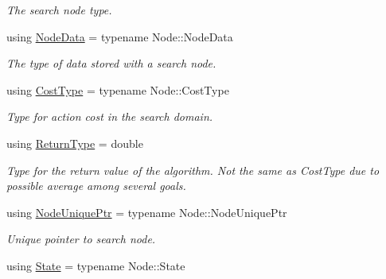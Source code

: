 \begin{DoxyCompactItemize}
\begin{DoxyCompactList}\small\item\em The search node type. \end{DoxyCompactList}\item 
using \hyperlink{structalgorithm_1_1BaseTraits_a05b654af4d6bd35af9e72d36a12d904f}{Node\+Data} = typename Node\+::\+Node\+Data\hypertarget{structalgorithm_1_1BaseTraits_a05b654af4d6bd35af9e72d36a12d904f}{}\label{structalgorithm_1_1BaseTraits_a05b654af4d6bd35af9e72d36a12d904f}

\begin{DoxyCompactList}\small\item\em The type of data stored with a search node. \end{DoxyCompactList}\item 
using \hyperlink{structalgorithm_1_1BaseTraits_ac8df9cb2ac3a5f35e201bf1a26dceed9}{Cost\+Type} = typename Node\+::\+Cost\+Type\hypertarget{structalgorithm_1_1BaseTraits_ac8df9cb2ac3a5f35e201bf1a26dceed9}{}\label{structalgorithm_1_1BaseTraits_ac8df9cb2ac3a5f35e201bf1a26dceed9}

\begin{DoxyCompactList}\small\item\em Type for action cost in the search domain. \end{DoxyCompactList}\item 
using \hyperlink{structalgorithm_1_1BaseTraits_a4bfbea73f1059634690455ff7128843d}{Return\+Type} = double\hypertarget{structalgorithm_1_1BaseTraits_a4bfbea73f1059634690455ff7128843d}{}\label{structalgorithm_1_1BaseTraits_a4bfbea73f1059634690455ff7128843d}

\begin{DoxyCompactList}\small\item\em Type for the return value of the algorithm. Not the same as Cost\+Type due to possible average among several goals. \end{DoxyCompactList}\item 
using \hyperlink{structalgorithm_1_1BaseTraits_afad7192f72922bcd6289a2c8c43a0cbc}{Node\+Unique\+Ptr} = typename Node\+::\+Node\+Unique\+Ptr\hypertarget{structalgorithm_1_1BaseTraits_afad7192f72922bcd6289a2c8c43a0cbc}{}\label{structalgorithm_1_1BaseTraits_afad7192f72922bcd6289a2c8c43a0cbc}

\begin{DoxyCompactList}\small\item\em Unique pointer to search node. \end{DoxyCompactList}\item 
using \hyperlink{structalgorithm_1_1BaseTraits_aa61b1003453764d9ca52cb1087526ba4}{State} = typename Node\+::\+State\hypertarget{structalgorithm_1_1BaseTraits_aa61b1003453764d9ca52cb1087526ba4}{}\label{structalgorithm_1_1BaseTraits_aa61b1003453764d9ca52cb1087526ba4}


\end{DoxyCompactItemize}
